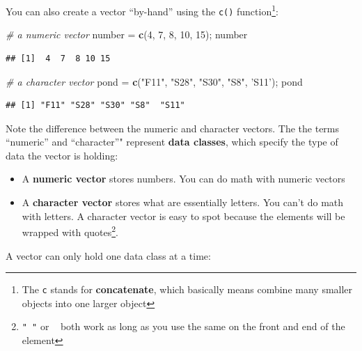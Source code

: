 \documentclass[]{book}
\newenvironment{Shaded}{\begin{snugshade}}{\end{snugshade}}
\newcommand{\KeywordTok}[1]{\textcolor[rgb]{0.13,0.29,0.53}{\textbf{#1}}}
\newcommand{\DecValTok}[1]{\textcolor[rgb]{0.00,0.00,0.81}{#1}}
\newcommand{\StringTok}[1]{\textcolor[rgb]{0.31,0.60,0.02}{#1}}
\newcommand{\CommentTok}[1]{\textcolor[rgb]{0.56,0.35,0.01}{\textit{#1}}}
\newcommand{\NormalTok}[1]{#1}
\providecommand{\tightlist}{%
  \setlength{\itemsep}{0pt}\setlength{\parskip}{0pt}}
\let\rmarkdownfootnote\footnote%
\def\footnote{\protect\rmarkdownfootnote}
\theoremstyle{definition}
\theoremstyle{definition}
\theoremstyle{definition}
\theoremstyle{remark}
\begin{document}
You can also create a vector ``by-hand'' using the \texttt{c()}
function\footnote{The \texttt{c} stands for \textbf{concatenate}, which
  basically means combine many smaller objects into one larger object}:

\begin{Shaded}
\begin{Highlighting}[]
\CommentTok{# a numeric vector}
\NormalTok{number =}\StringTok{ }\KeywordTok{c}\NormalTok{(}\DecValTok{4}\NormalTok{, }\DecValTok{7}\NormalTok{, }\DecValTok{8}\NormalTok{, }\DecValTok{10}\NormalTok{, }\DecValTok{15}\NormalTok{); number}
\end{Highlighting}
\end{Shaded}

\begin{verbatim}
## [1]  4  7  8 10 15
\end{verbatim}

\begin{Shaded}
\begin{Highlighting}[]
\CommentTok{# a character vector}
\NormalTok{pond =}\StringTok{ }\KeywordTok{c}\NormalTok{(}\StringTok{"F11"}\NormalTok{, }\StringTok{"S28"}\NormalTok{, }\StringTok{"S30"}\NormalTok{, }\StringTok{"S8"}\NormalTok{, }\StringTok{'S11'}\NormalTok{); pond}
\end{Highlighting}
\end{Shaded}

\begin{verbatim}
## [1] "F11" "S28" "S30" "S8"  "S11"
\end{verbatim}

Note the difference between the numeric and character vectors. The the
terms ``numeric'' and ``character''" represent \textbf{data classes},
which specify the type of data the vector is holding:

\begin{itemize}
\tightlist
\item
  A \textbf{numeric vector} stores numbers. You can do math with numeric
  vectors
\item
  A \textbf{character vector} stores what are essentially letters. You
  can't do math with letters. A character vector is easy to spot because
  the elements will be wrapped with quotes\footnote{\texttt{"\ "} or
    \texttt{\textquotesingle{}\ \textquotesingle{}} both work as long as
    you use the same on the front and end of the element}.
\end{itemize}

A vector can only hold one data class at a time:
\end{document}
